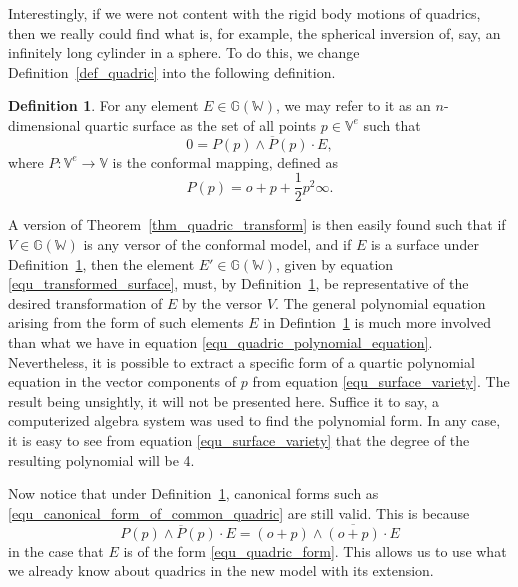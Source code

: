\documentclass{birkjour}
\theoremstyle{definition}
\newtheorem{defn}[thm]{Definition}
\theoremstyle{remark}
\numberwithin{equation}{section}
\newcommand{\G}{\mathbb{G}}
\newcommand{\V}{\mathbb{V}}
\newcommand{\W}{\mathbb{W}}
\newcommand{\nvao}{o}
\newcommand{\nvai}{\infty}
\begin{document}
Interestingly, if we were not content with the rigid body motions of
quadrics, then we really could find what is, for example, the spherical
inversion of, say, an infinitely long cylinder in a sphere.  To do this, we change
Definition~\ref{def_quadric} into the following definition.
\begin{defn}\label{def_surface}
For any element $E\in\G(\W)$, we may refer to it as an $n$-dimensional
quartic surface as the set of all points $p\in\V^e$ such that
\begin{equation}\label{equ_surface_variety}
0 = P(p)\wedge\overline{P}(p)\cdot E,
\end{equation}
where $P:\V^e\to\V$ is the conformal mapping, defined as
\begin{equation}
P(p) = \nvao + p + \frac{1}{2}p^2\nvai.
\end{equation}
\end{defn}
A version of Theorem~\ref{thm_quadric_transform} is then easily found
such that if $V\in\G(\W)$ is any versor of the conformal model, and if $E$
is a surface under Definition~\ref{def_surface}, then the element $E'\in\G(\W)$,
given by equation \eqref{equ_transformed_surface}, must, by Definition~\ref{def_surface},
 be representative of the desired transformation of $E$ by the versor $V$.  The general
polynomial equation arising from the form of
such elements $E$ in Defintion~\ref{def_surface} is much more involved than
what we have in equation \eqref{equ_quadric_polynomial_equation}.  Nevertheless, it is possible to extract
a specific form of a quartic polynomial equation in
the vector components of $p$ from equation \eqref{equ_surface_variety}.
The result being unsightly, it will not be presented here.  Suffice it to say, a computerized
algebra system was used to find the polynomial form.  In any case, it is easy
to see from equation \eqref{equ_surface_variety} that the degree of the resulting
polynomial will be 4.

Now notice that under Definition~\ref{def_surface}, canonical forms
such as \eqref{equ_canonical_form_of_common_quadric} are still valid.
This is because
\begin{equation}
P(p)\wedge\overline{P}(p)\cdot E = (\nvao+p)\wedge\overline{(\nvao+p)}\cdot E
\end{equation}
in the case that $E$ is of the form \eqref{equ_quadric_form}.  This allows
us to use what we already know about quadrics in the new model with its extension.
\end{document}
